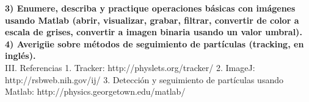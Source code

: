 \documentclass[letterpaper,11pt]{article}
\begin{document}



\textbf{3) Enumere, describa y practique operaciones básicas con imágenes usando Matlab
(abrir, visualizar, grabar, filtrar, convertir de color a escala de grises, convertir a imagen binaria usando un valor umbral).}\\

\textbf{4) Averigüe sobre métodos de seguimiento de partículas (tracking, en inglés).}\\


III. Referencias
1. Tracker: http://physlets.org/tracker/
2. ImageJ: http://rsbweb.nih.gov/ij/
3. Detección y seguimiento de partículas usando Matlab:
http://physics.georgetown.edu/matlab/ 














\newpage




\newpage

\end{document}
